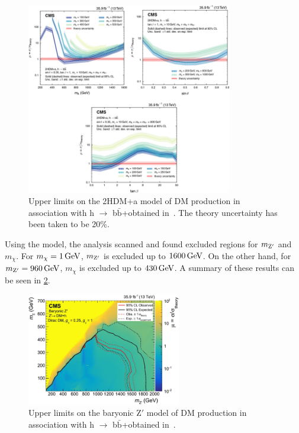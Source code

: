 \begin{figure}[ht]
\centering
\includegraphics[width=0.8\textwidth]{Chapters/Experiment/2019hbbmet_results.png}
\caption{Upper limits on the 2HDM+a model of DM production in association with h $\to$ b$\bar{\mathrm{b}}$+\ptmiss obtained in~\cite{cms:hbb2019}. The theory uncertainty has been taken to be 20\%.}
\label{fig:hbbmet20191}
\end{figure}

Using the \Zp model, the analysis scanned and found excluded regions for $m_{\mathrm{Z}'}$ and $m_\chi$. For $m_\chi = \GeV{1}$, $m_{\mathrm{Z}'}$ is excluded up to $\GeV{1600}$. On the other hand, for $m_\Zp = \GeV{960}$, $m_\chi$ is excluded up to $\GeV{430}$. A summary of these results can be seen in \cref{fig:hbbmet20192}.

\begin{figure}[ht]
\centering
\includegraphics[width=0.6\textwidth]{Chapters/Experiment/2019hbbmet_results2.png}
\caption{Upper limits on the baryonic Z$'$ model of DM production in association with h $\to$ b$\bar{\mathrm{b}}$+\ptmiss obtained in~\cite{cms:hbb2019}.}
\label{fig:hbbmet20192}
\end{figure}

